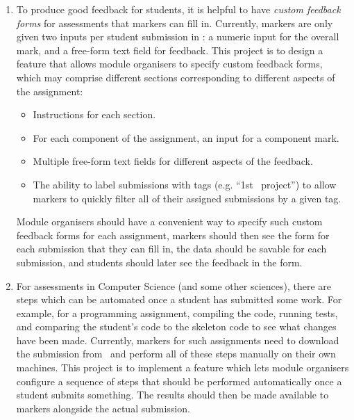 \begin{enumerate}
    \item To produce good feedback for students, it is helpful to have \emph{custom feedback forms} for assessments that markers can fill in. Currently, markers are only given two inputs per student submission in \higherEdCSRS: a numeric input for the overall mark, and a free-form text field for feedback. This project is to design a feature that allows module organisers to specify custom feedback forms, which may comprise different sections corresponding to different aspects of the assignment:
    \begin{itemize}
        \item Instructions for each section.
        \item For each component of the assignment, an input for a component mark.
        \item Multiple free-form text fields for different aspects of the feedback.
        \item The ability to label submissions with tags (e.g. ``1st \ssh\ project'') to allow markers to quickly filter all of their assigned submissions by a given tag.
    \end{itemize}
    Module organisers should have a convenient way to specify such custom feedback forms for each assignment, markers should then see the form for each submission that they can fill in, the data should be savable for each submission, and students should later see the feedback in the form.

    \item For assessments in Computer Science (and some other sciences), there are steps which can be automated once a student has submitted some work. For example, for a programming assignment, compiling the code, running tests, and comparing the student's code to the skeleton code to see what changes have been made. Currently, markers for such assignments need to download the submission from \higherEdCSRS\ and perform all of these steps manually on their own machines. This project is to implement a feature which lets module organisers configure a sequence of steps that should be performed automatically once a student submits something. The results should then be made available to markers alongside the actual submission.


\end{enumerate}
